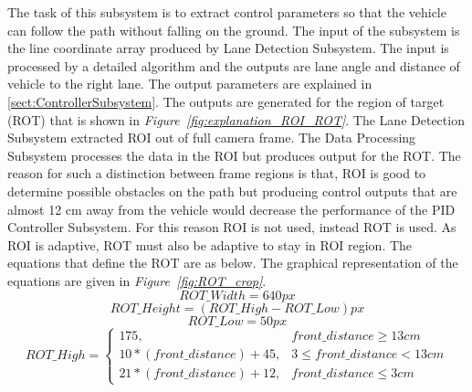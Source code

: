 \documentclass[a4paper,12pt]{article}
\begin{document}
\begin{enumerate}[A.]
	The task of this subsystem is to extract control parameters so that the vehicle can follow the path without falling on the ground. The input of the subsystem is the line coordinate array produced by Lane Detection Subsystem. The input is processed by a detailed algorithm and the outputs are lane angle and distance of vehicle to the right lane. The output parameters are explained in \ref{sect:ControllerSubsystem}. The outputs are generated for the region of target (ROT) that is shown in \textit{Figure~\ref{fig:explanation_ROI_ROT}}. The Lane Detection Subsystem extracted ROI out of full camera frame. The Data Processing Subsystem processes the data in the ROI but produces output for the ROT. The reason for such a distinction between frame regions is that, ROI is good to determine possible obstacles on the path but producing control outputs that are almost 12 cm away from the vehicle would decrease the performance of the PID Controller Subsystem. For this reason ROI is not used, instead ROT is used. As ROI is adaptive, ROT must also be adaptive to stay in ROI region. The equations that define the ROT are as below. The graphical representation of the equations are given in \textit{Figure~\ref{fig:ROT_crop}}.
\begin{equation}
ROT\_Width = 640 px
\end{equation}
\begin{equation}
ROT\_Height = (ROT\_High - ROT\_Low) px
\end{equation}
\begin{equation}
ROT\_Low = 50 px
\end{equation}
\begin{equation}
ROT\_High =
\begin{cases}
175, & front\_distance \geq 13 cm \\
10*(front\_distance) + 45, &3\leq front\_distance <  13 cm \\
21*(front\_distance) + 12, & front\_distance \leq 3 cm
\end{cases}
\end{equation}
\begin{figure}[t!]
	

\end{figure}
\end{enumerate}
\end{document}
